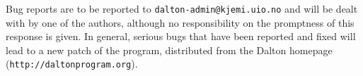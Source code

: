 Bug reports are to be reported to \verb|dalton-admin@kjemi.uio.no| and
will be dealt with by one of the authors, although no responsibility
on the promptness of this response is given. In general, serious bugs
that have been
reported and fixed will lead to a new patch of the program, distributed from the
Dalton homepage (\verb|http://daltonprogram.org|).
